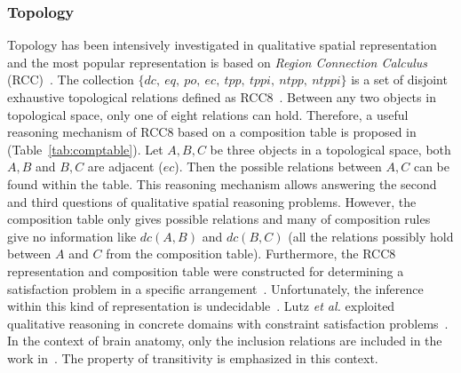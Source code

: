 \documentclass{article}
\begin{document}
\subsubsection{Topology}
Topology has been intensively investigated in qualitative spatial representation and the most popular representation is based on \textit{Region Connection Calculus} (RCC)~\cite{cohn1997qualitative}.
The collection $\{dc,~eq,~po,~ec,~tpp,~tppi,~ntpp,~ntppi\}$ is a set of disjoint exhaustive topological relations defined as RCC8~\cite{randell1992spatial}.
Between any two objects in topological space, only one of eight relations can hold.
Therefore, a useful reasoning mechanism of RCC8 based on a composition table is proposed in~\cite{egenhofer1991reasoning} (Table~\ref{tab:comptable}).
Let $A,B,C$ be three objects in a topological space, both $A,B$ and $B,C$ are adjacent ($ec$). Then the possible relations between $A,C$ can be found within the table.
This reasoning mechanism allows answering the second and third questions of qualitative spatial reasoning problems. 
However, the composition table only gives possible relations and many of composition rules give no information like $dc(A,B)$ and $dc(B,C)$ (all the relations possibly
hold between $A$ and $C$ from the composition table).
Furthermore, the RCC8 representation and composition table were constructed for determining a satisfaction problem 
in a specific arrangement~\cite{wessel2000obstacle,wessel00alcra}.
Unfortunately, the inference within this kind of representation is undecidable~\cite{wessel2000obstacle}. 
Lutz \textit{et al.} exploited qualitative reasoning in concrete domains with constraint satisfaction problems~\cite{lutz2007tableau}.
In the context of brain anatomy, only the inclusion relations are included in the work in~\cite{santos2012region}.
The property of transitivity  is emphasized in this context. 
\end{document}
